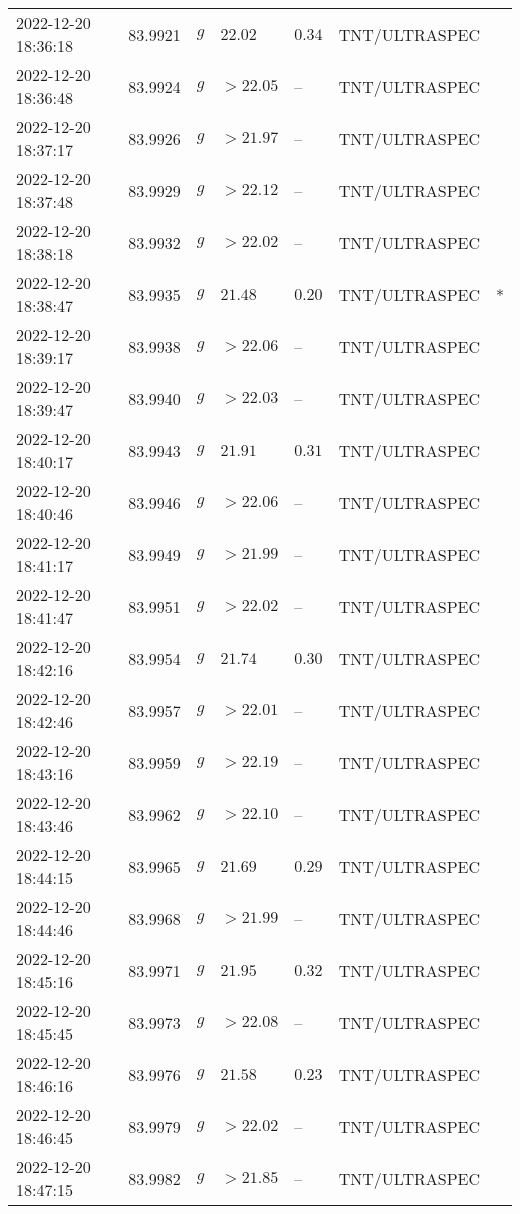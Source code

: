 \documentclass{nature_plusfigure}
\begin{document}
\begin{supplement}
\begin{center}
\begin{longtable}{lllllll}
2022-12-20 18:36:18 & 83.9921 & $g$ & $22.02$ & $0.34$ & TNT/ULTRASPEC &  \\ 
2022-12-20 18:36:48 & 83.9924 & $g$ & $>22.05$ & -- & TNT/ULTRASPEC &  \\ 
2022-12-20 18:37:17 & 83.9926 & $g$ & $>21.97$ & -- & TNT/ULTRASPEC &  \\ 
2022-12-20 18:37:48 & 83.9929 & $g$ & $>22.12$ & -- & TNT/ULTRASPEC &  \\ 
2022-12-20 18:38:18 & 83.9932 & $g$ & $>22.02$ & -- & TNT/ULTRASPEC &  \\ 
2022-12-20 18:38:47 & 83.9935 & $g$ & $21.48$ & $0.20$ & TNT/ULTRASPEC & * \\ 
2022-12-20 18:39:17 & 83.9938 & $g$ & $>22.06$ & -- & TNT/ULTRASPEC &  \\ 
2022-12-20 18:39:47 & 83.9940 & $g$ & $>22.03$ & -- & TNT/ULTRASPEC &  \\ 
2022-12-20 18:40:17 & 83.9943 & $g$ & $21.91$ & $0.31$ & TNT/ULTRASPEC &  \\ 
2022-12-20 18:40:46 & 83.9946 & $g$ & $>22.06$ & -- & TNT/ULTRASPEC &  \\ 
2022-12-20 18:41:17 & 83.9949 & $g$ & $>21.99$ & -- & TNT/ULTRASPEC &  \\ 
2022-12-20 18:41:47 & 83.9951 & $g$ & $>22.02$ & -- & TNT/ULTRASPEC &  \\ 
2022-12-20 18:42:16 & 83.9954 & $g$ & $21.74$ & $0.30$ & TNT/ULTRASPEC &  \\ 
2022-12-20 18:42:46 & 83.9957 & $g$ & $>22.01$ & -- & TNT/ULTRASPEC &  \\ 
2022-12-20 18:43:16 & 83.9959 & $g$ & $>22.19$ & -- & TNT/ULTRASPEC &  \\ 
2022-12-20 18:43:46 & 83.9962 & $g$ & $>22.10$ & -- & TNT/ULTRASPEC &  \\ 
2022-12-20 18:44:15 & 83.9965 & $g$ & $21.69$ & $0.29$ & TNT/ULTRASPEC &  \\ 
2022-12-20 18:44:46 & 83.9968 & $g$ & $>21.99$ & -- & TNT/ULTRASPEC &  \\ 
2022-12-20 18:45:16 & 83.9971 & $g$ & $21.95$ & $0.32$ & TNT/ULTRASPEC &  \\ 
2022-12-20 18:45:45 & 83.9973 & $g$ & $>22.08$ & -- & TNT/ULTRASPEC &  \\ 
2022-12-20 18:46:16 & 83.9976 & $g$ & $21.58$ & $0.23$ & TNT/ULTRASPEC &  \\ 
2022-12-20 18:46:45 & 83.9979 & $g$ & $>22.02$ & -- & TNT/ULTRASPEC &  \\ 
2022-12-20 18:47:15 & 83.9982 & $g$ & $>21.85$ & -- & TNT/ULTRASPEC &  \\ 

\end{longtable}
\end{center}
\end{supplement}
\end{document}
